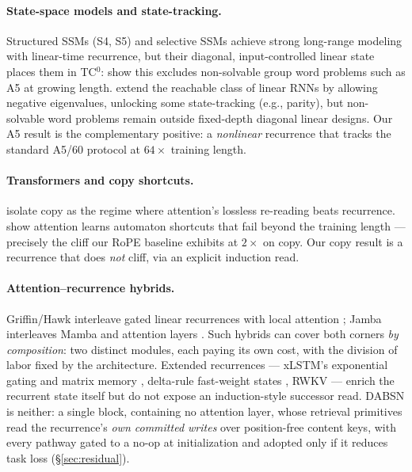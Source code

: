 \documentclass[11pt]{article}
\newcommand{\model}{DABSN}
\begin{document}
\paragraph{State-space models and state-tracking.} Structured SSMs (S4, S5)
and selective SSMs \citep{gu2023mamba} achieve strong long-range modeling with
linear-time recurrence, but their diagonal, input-controlled linear state
places them in TC$^0$: \citet{merrill2024illusion} show this excludes
non-solvable group word problems such as A5 at growing length.
\citet{grazzi2024unlocking} extend the reachable class of linear RNNs by
allowing negative eigenvalues, unlocking some state-tracking (e.g., parity),
but non-solvable word problems remain outside fixed-depth diagonal linear
designs. Our A5 result is the complementary positive: a \emph{nonlinear}
recurrence that tracks the standard A5/60 protocol at $64\times$ training length.

\paragraph{Transformers and copy shortcuts.} \citet{jelassi2024repeat} isolate
copy as the regime where attention's lossless re-reading beats recurrence.
\citet{liu2023transformers} show attention learns automaton shortcuts that
fail beyond the training length --- precisely the cliff our RoPE baseline
exhibits at $2\times$ on copy. Our copy result is a recurrence that does
\emph{not} cliff, via an explicit induction read.

\paragraph{Attention--recurrence hybrids.} Griffin/Hawk interleave gated
linear recurrences with local attention \citep{de2024griffin}; Jamba
interleaves Mamba and attention layers \citep{lieber2024jamba}. Such hybrids
can cover both corners \emph{by composition}: two distinct modules, each
paying its own cost, with the division of labor fixed by the architecture.
Extended recurrences --- xLSTM's exponential gating and matrix memory
\citep{beck2024xlstm}, delta-rule fast-weight states
\citep{schlag2021linear,yang2024gated}, RWKV \citep{peng2023rwkv} --- enrich
the recurrent state itself but do not expose an induction-style successor
read. \model{} is neither: a single block, containing no attention layer,
whose retrieval primitives read the recurrence's \emph{own committed writes}
over position-free content keys, with every pathway gated to a no-op at
initialization and adopted only if it reduces task loss
(\S\ref{sec:residual}).
\end{document}

